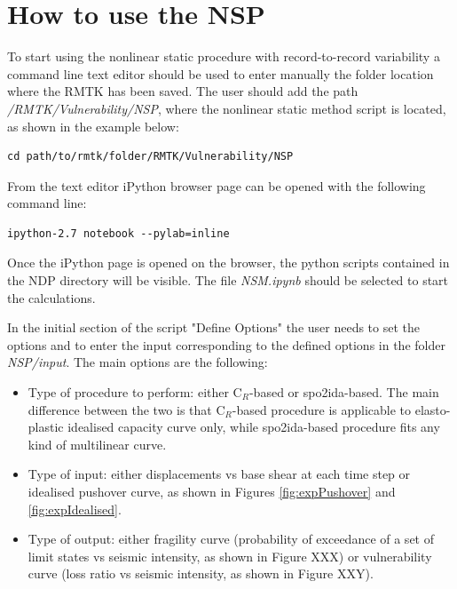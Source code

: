 \section{How to use the NSP}
\label{sec:NSP}
To start using the nonlinear static procedure with record-to-record variability a command line text editor should be used to enter manually the folder location where the RMTK has been saved. The user should add the path \textit{/RMTK/Vulnerability/NSP}, where the nonlinear static method script is located, as shown in the example below:

\begin{Verbatim}[frame=single, commandchars=\\\{\}, samepage=true]
cd path/to/rmtk/folder/RMTK/Vulnerability/NSP
\end{Verbatim}

From the text editor iPython browser page can be opened with the following command line:

\begin{Verbatim}[frame=single, commandchars=\\\{\}, samepage=true]
ipython-2.7 notebook --pylab=inline
\end{Verbatim}

Once the iPython page is opened on the browser, the python scripts contained in the NDP directory will be visible. The file \textit{NSM.ipynb} should be selected to start the calculations.

In the initial section of the script "Define Options" the user needs to set the options and to enter the input corresponding to the defined options in the folder \textit{NSP/input}. The main options are the following:

\begin{itemize}
\item Type of procedure to perform: either C$_R$-based or spo2ida-based. The main difference between the two is that C$_R$-based procedure is applicable to elasto-plastic idealised capacity curve only, while spo2ida-based procedure fits any kind of multilinear curve.
\item Type of input: either displacements vs base shear at each time step or idealised pushover curve, as shown in Figures \ref{fig:expPushover} and \ref{fig:expIdealised}.
\item Type of output: either fragility curve (probability of exceedance of a set of limit states vs seismic intensity, as shown in Figure XXX) or vulnerability curve (loss ratio vs seismic intensity, as shown in Figure XXY).
\end{itemize}

